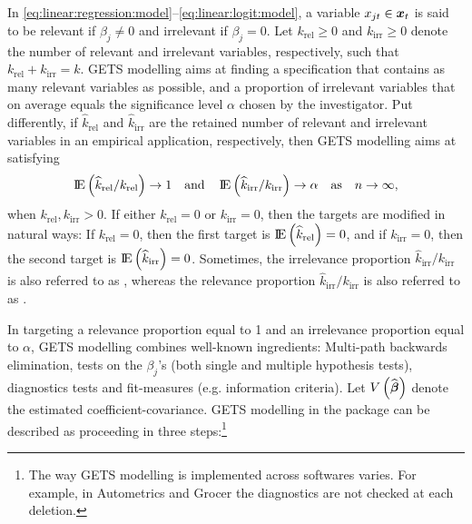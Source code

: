 In \eqref{eq:linear:regression:model}--\eqref{eq:linear:logit:model}, a variable $x_{jt} \in \boldsymbol{x}_t$ is said to be relevant if $\beta_j \neq 0$ and irrelevant if $\beta_j = 0$. Let $k_{\text{rel}} \geq 0$ and $k_{\text{irr}} \geq 0$ denote the number of relevant and irrelevant variables, respectively, such that $k_{\text{rel}} + k_{\text{irr}} = k$. GETS modelling aims at finding a specification that contains as many relevant variables as possible, and a proportion of irrelevant variables that on average equals the significance level $\alpha$ chosen by the investigator. Put differently, if $\widehat{k}_{\text{rel}}$ and $\widehat{k}_{\text{irr}}$ are the retained number of relevant and irrelevant variables in an empirical application, respectively, then GETS modelling aims at satisfying 
%
\begin{equation}\label{eq:asymptotic:gauge:and:potency}
	\E\left(\widehat{k}_{\text{rel}}/k_{\text{rel}}\right) \rightarrow 1 \quad \textnormal{and} \quad \E\left(\widehat{k}_{\text{irr}}/k_{\text{irr}}\right) \rightarrow \alpha \quad \textnormal{as} \quad n\rightarrow\infty,
\end{equation}
%
when $k_{\text{rel}},k_{\text{irr}}>0$.  If either $k_{\text{rel}}=0$ or $k_{\text{irr}}=0$, then the targets are modified in natural ways: If $k_{\text{rel}}=0$, then the first target is $\E\left(\widehat{k}_{\text{rel}}\right) = 0$, and if $k_{\text{irr}}=0$, then the second target is $\E\left(\widehat{k}_{\text{irr}}\right) = 0$. Sometimes, the irrelevance proportion $\widehat{k}_{\text{irr}}/k_{\text{irr}}$ is also referred to as , whereas the relevance proportion $\widehat{k}_{\text{irr}}/k_{\text{irr}}$ is also referred to as .

In targeting a relevance proportion equal to 1 and an irrelevance proportion equal to $\alpha$, GETS modelling combines well-known ingredients: Multi-path backwards elimination, tests on the $\beta_j$'s (both single and multiple hypothesis tests), diagnostics tests and fit-measures (e.g. information criteria). Let $V\left(\widehat{\boldsymbol{\beta}}\right)$ denote the estimated coefficient-covariance. GETS modelling in the package  can be described as proceeding in three steps:\footnote{The way GETS modelling is implemented across softwares varies. For example, in Autometrics and Grocer the diagnostics are not checked at each deletion.} 

